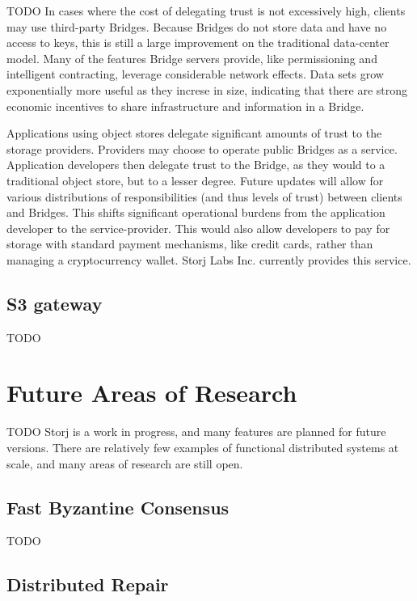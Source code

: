\documentclass[a4paper,10pt]{article}
\newcommand{\todo}[1]{{\color{red} TODO #1}}
\begin{document}
\todo{
In cases where the cost of delegating trust is not excessively high, clients may
use third-party Bridges. Because Bridges do not store data and have no access to
keys, this is still a large improvement on the traditional data-center model.
Many of the features Bridge servers provide, like permissioning and intelligent
contracting, leverage considerable network effects. Data sets grow exponentially
more useful as they increse in size, indicating that there are strong economic
incentives to share infrastructure and information in a Bridge.

Applications using object stores delegate significant amounts of trust to the
storage providers. Providers may choose to operate public Bridges as a service.
Application developers then delegate trust to the Bridge, as they would to a
traditional object store, but to a lesser degree. Future updates will allow for
various distributions of responsibilities (and thus levels of trust) between
clients and Bridges. This shifts significant operational burdens from the
application developer to the service-provider. This would also allow developers
to pay for storage with standard payment mechanisms, like credit cards, rather
than managing a cryptocurrency wallet. Storj Labs Inc. currently provides this
service.
}

\subsection{S3 gateway}

\todo{}

\section{Future Areas of Research}

\todo{
Storj is a work in progress, and many features are planned for future versions.
There are relatively few examples of functional distributed systems at scale,
and many areas of research are still open.
}

\subsection{Fast Byzantine Consensus}

\todo{}

\subsection{Distributed Repair}
\end{document}
